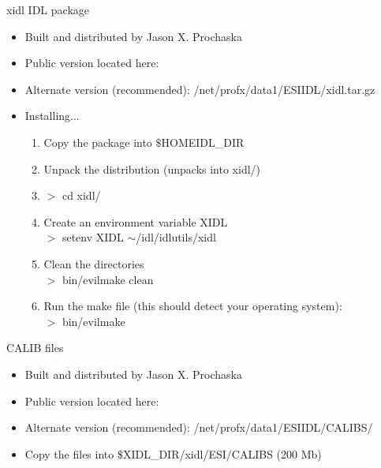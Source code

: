 \documentclass[11pt,letterpaper,dvips]{article}
\begin{document}
\begin{enumerate}
{\Large   \item xidl IDL package}
   \begin{itemize}
	\item Built and distributed by Jason X. Prochaska
	\item Public version located here: 
	\item Alternate version (recommended): 
	/net/profx/data1/ESIIDL/xidl.tar.gz
	\item Installing...
	\begin{enumerate}
	  \item Copy the package into $\$$HOMEIDL\_DIR
	  \item Unpack the distribution (unpacks into xidl/)
	  \item $>$ cd xidl/
	  \item Create an environment variable XIDL\\
	  $>$ setenv XIDL $\sim$/idl/idlutils/xidl
	  \item Clean the directories \\
	  $>$ bin/evilmake clean
	  \item Run the make file (this should detect your operating system):  \\
	  $>$ bin/evilmake
	\end{enumerate}
   \end{itemize}

{\Large   \item CALIB files}
   \begin{itemize}
	\item Built and distributed by Jason X. Prochaska
	\item Public version located here: 
	\item Alternate version (recommended): 
	/net/profx/data1/ESIIDL/CALIBS/
	\item Copy the files into $\$$XIDL\_DIR/xidl/ESI/CALIBS  (200 Mb)
   \end{itemize}


\end{enumerate}
\end{document}
